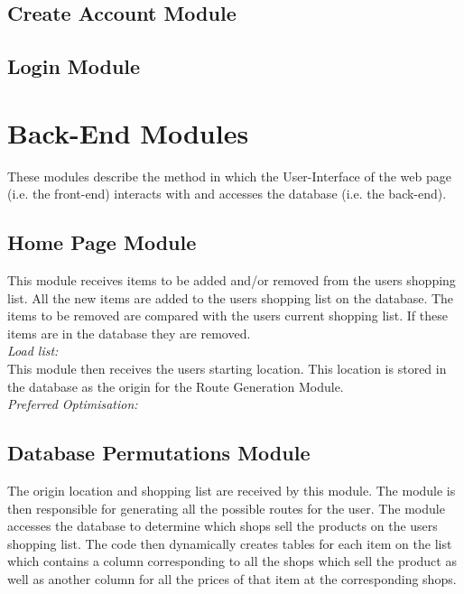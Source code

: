 \documentclass[10pt, a4paper, onecolumn]{scrartcl}
\begin{document}
		
		\subsection{Create Account Module}
		
		\subsection{Login Module}
	
	\section{Back-End Modules}
		
		These modules describe the method in which the User-Interface of the web page (i.e. the front-end) interacts with and accesses the database (i.e. the back-end).
		
		\subsection{Home Page Module}
			
			This module receives items to be added and/or removed from the users shopping list. All the new items are added to the users shopping list on the database. The items to be removed are compared with the users current shopping list. If these items are in the database they are removed.\\
			
			\textit{Load list:}\\
			
			This module then receives the users starting location. This location is stored in the database as the origin for the Route Generation Module.\\
			
			\textit{Preferred Optimisation:}
			
		\subsection{Database Permutations Module}
			
			The origin location and shopping list are received by this module. The module is then responsible for generating all the possible routes for the user. The module accesses the database to determine which shops sell the products on the users shopping list. The code then dynamically creates tables for each item on the list which contains a column corresponding to all the shops which sell the product as well as another column for all the prices of that item at the corresponding shops. \\
						
\end{document}
